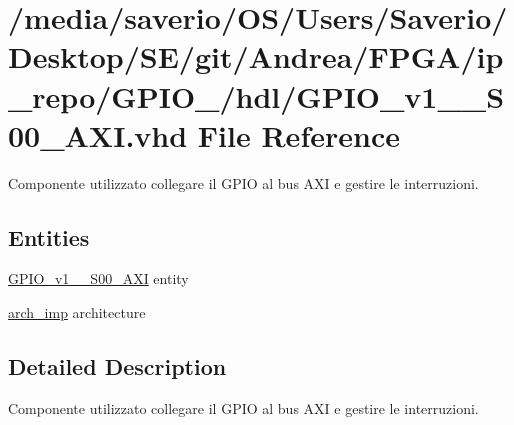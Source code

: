 \hypertarget{GPIO__v1__0__S00__AXI_8vhd}{}\section{/media/saverio/\+O\+S/\+Users/\+Saverio/\+Desktop/\+S\+E/git/\+Andrea/\+F\+P\+G\+A/ip\+\_\+repo/\+G\+P\+I\+O\+\_/hdl/\+G\+P\+I\+O\+\_\+v1\+\_\+\_\+\+S00\+\_\+\+A\+XI.vhd File Reference}
\label{GPIO__v1__0__S00__AXI_8vhd}


Componente utilizzato collegare il G\+P\+IO al bus A\+XI e gestire le interruzioni.  


\subsection*{Entities}
\begin{DoxyCompactItemize}
\item 
\hyperlink{classGPIO__v1__0__S00__AXI}{G\+P\+I\+O\+\_\+v1\+\_\+\_\+\+S00\+\_\+\+A\+XI} entity
\item 
\hyperlink{classGPIO__v1__0__S00__AXI_1_1arch__imp}{arch\+\_\+imp} architecture
\end{DoxyCompactItemize}


\subsection{Detailed Description}
Componente utilizzato collegare il G\+P\+IO al bus A\+XI e gestire le interruzioni. 

